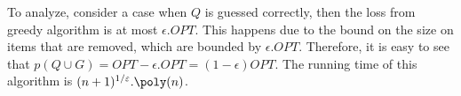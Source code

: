 To analyze, consider a case when $Q$ is guessed correctly, then the loss from greedy algorithm is at most $\epsilon.OPT$.
This happens due to the bound on the size on items that are removed, which are bounded by $\epsilon.OPT$.
Therefore, it is easy to see that $p(Q \cup G) = OPT - \epsilon.OPT = (1-\epsilon)OPT$.
The running time of this algorithm is $(n+1)^{1/\epsilon} . \poly(n)$.

% 
% 
% 
% 
